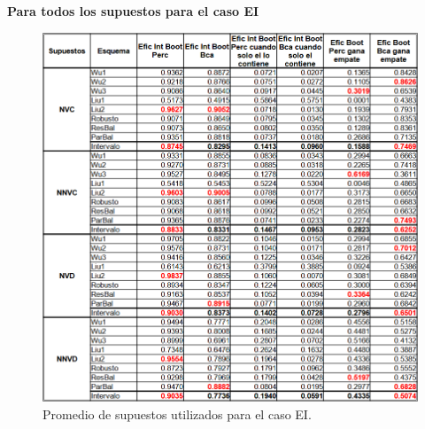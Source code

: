 \textbf{Para todos los supuestos para el caso EI}

\begin{figure}[ht] 
	\centering 
	\includegraphics[width=0.80\linewidth]{img/EI_Prom_Supuestos.png} 
	\caption{Promedio de supuestos utilizados para el caso EI.} 
	\label{fig:PromSupuUtiliEI}
\end{figure}
